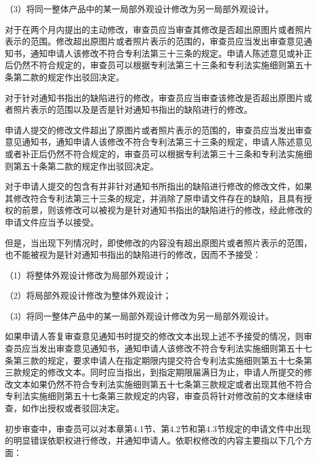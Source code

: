 {\setlength{\parindent}{17.1bp}（3）将同一整体产品中的某一局部外观设计修改为另一局部外观设计。\par}

对于在两个月内提出的主动修改，审查员应当审查其修改是否超出原图片或者照片表示的范围。修改超出原图片或者照片表示的范围的，审查员应当发出审查意见通知书，通知申请人该修改不符合专利法第三十三条的规定。申请人陈述意见或补正后仍然不符合规定的，审查员可以根据专利法第三十三条和专利法实施细则第五十条第二款的规定作出驳回决定。

对于针对通知书指出的缺陷进行的修改，审查员应当审查该修改是否超出原图片或者照片表示的范围以及是否是针对通知书指出的缺陷进行的修改。

申请人提交的修改文件超出了原图片或者照片表示的范围的，审查员应当发出审查意见通知书，通知申请人该修改不符合专利法第三十三条的规定，申请人陈述意见或者补正后仍然不符合规定的，审查员可以根据专利法第三十三条和专利法实施细则第五十条第二款的规定作出驳回决定。

对于申请人提交的包含有并非针对通知书所指出的缺陷进行修改的修改文件，如果其修改符合专利法第三十三条的规定，并消除了原申请文件存在的缺陷，且具有授权的前景，则该修改可以被视为是针对通知书指出的缺陷进行的修改，经此修改的申请文件应当予以接受。

但是，当出现下列情况时，即使修改的内容没有超出原图片或者照片表示的范围，也不能被视为是针对通知书指出的缺陷进行的修改，因而不予接受：

{\setlength{\parindent}{17.1bp}（1）将整体外观设计修改为局部外观设计；\par}

{\setlength{\parindent}{17.1bp}（2）将局部外观设计修改为整体外观设计；\par}

{\setlength{\parindent}{17.1bp}（3）将同一整体产品中的某一局部外观设计修改为另一局部外观设计。\par}

如果申请人答复审查意见通知书时提交的修改文本出现上述不予接受的情况，则审查员应当发出审查意见通知书，通知申请人该修改不符合专利法实施细则第五十七条第三款的规定，要求申请人在指定期限内提交符合专利法实施细则第五十七条第三款规定的修改文本。同时应当指出，到指定期限届满日为止，申请人所提交的修改文本如果仍然不符合专利法实施细则第五十七条第三款规定或者出现其他不符合专利法实施细则第五十七条第三款规定的内容，审查员将针对修改前的文本继续审查，如作出授权或者驳回决定。

初步审查中，审查员可以对本章第4.1节、第4.2节和第4.3节规定的申请文件中出现的明显错误依职权进行修改，并通知申请人。依职权修改的内容主要指以下几个方面：

